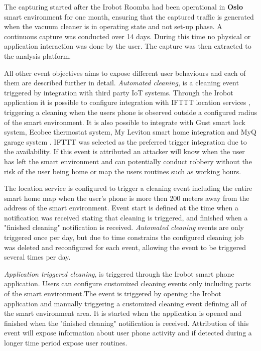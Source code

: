 The capturing started after the Irobot Roomba had been operational in \textbf{Oslo} smart environment for one month, ensuring that the captured traffic is generated when the vacuum cleaner is in operating state and not set-up phase. A continuous capture was conducted over 14 days. During this time no physical or application interaction was done by the user. The capture was then extracted to the analysis platform.

All other event objectives aims to expose different user behaviours and each of them are described further in detail. \textit{Automated cleaning}, is a cleaning event triggered by integration with third party IoT systems. Through the Irobot application it is possible to configure integration with IFTTT location services \cite{ifttt}, triggering a cleaning when the users phone is observed outside a configured radius of the smart environment. It is also possible to integrate with Gust smart lock system, Ecobee thermostat system, My Leviton smart home integration and MyQ garage system \cite{irobot}. IFTTT was selected as the preferred trigger integration due to the availability. If this event is attributed an attacker will know when the user has left the smart environment and can potentially conduct robbery without the risk of the user being home or map the users routines such as working hours.

The location service is configured to trigger a cleaning event including the entire smart home map when the user's phone is more then 200 meters away from the address of the smart environment. Event start is defined at the time when a notification was received stating that cleaning is triggered, and finished when a "finished cleaning" notification is received. \textit{Automated cleaning} events are only triggered once per day, but due to time constrains the configured cleaning job was deleted and reconfigured for each event, allowing the event to be triggered several times per day.  

\textit{Application triggered cleaning}, is triggered through the Irobot smart phone application. Users can configure customized cleaning events only including parts of the smart environment.The event is triggered by opening the Irobot application and manually triggering a customized cleaning event defining all of the smart environment area. It is started when the application is opened and finished when the "finished cleaning" notification is received. Attribution of this event will expose information about user phone activity and if detected during a longer time period expose user routines. 


